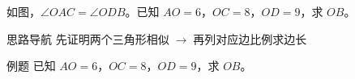 \documentclass{exam-zh}
\begin{document}

\begin{eduProblemBlock}[例题]
\noindent
\begin{minipage}[t]{\dimexpr\linewidth-70mm-6mm\relax}
\vspace{0pt}
如图，$\angle OAC=\angle ODB$。已知 $AO=6$，$OC=8$，$OD=9$，求 $OB$。

\end{minipage}\hfill
\begin{diagramcoltikz}{70mm}{先找交点处的对顶角，再核对题设标出的另一组等角。}
}
\end{diagramcoltikz}
\end{eduProblemBlock}





\begin{eduAuxItem}{思路导航}
先证明两个三角形相似$\;\to\;$再列对应边比例求边长\end{eduAuxItem}




\begin{eduSubQuestionItem}{例题}
已知 $AO=6$，$OC=8$，$OD=9$，求 $OB$。\end{eduSubQuestionItem}

\begin{eduDualExplain}
  \begin{eduExplainLeft}
  \end{eduExplainLeft}

  \begin{eduExplainRight}
  \end{eduExplainRight}
\end{eduDualExplain}
\end{document}
